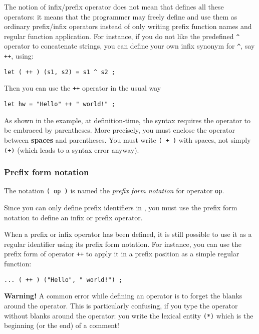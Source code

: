 The notion of infix/prefix operator does not mean that {\focal} defines all
these operators: it means that the programmer may freely define and use them
as ordinary prefix/infix operators instead of only writing prefix function
names and regular function application. For instance, if you do not like the
{\focal} predefined \verb"^" operator to concatenate strings, you can define your
own infix synonym for \verb"^", say {\tt ++}, using:

{\scriptsize
\begin{lstlisting}
let ( ++ ) (s1, s2) = s1 ^ s2 ;
\end{lstlisting}
}
Then you can use the {\tt ++} operator in the usual way
{\scriptsize
\begin{lstlisting}
let hw = "Hello" ++ " world!" ;
\end{lstlisting}
}

As shown in the example, at definition-time, the syntax requires
the operator to be embraced by parentheses. More precisely, you must
enclose the operator between {\bf spaces} and parentheses.
You must write {\tt ( + )} with spaces, not simply {\tt (+)} (which leads
to a syntax error anyway).

\subsubsection{Prefix form notation}

The notation {\tt ( op )} is named the {\em prefix form notation} for
operator {\tt op}.

Since you can only define prefix identifiers in {\focal}, you must use the
prefix form notation to define an infix or prefix operator.

When a prefix or infix operator has been defined, it is still possible
to use it as a regular identifier using its prefix form notation.
For instance, you can use the prefix form of operator {\tt ++}
to apply it in a prefix position as a simple regular function: %

{\scriptsize
\begin{lstlisting}
... ( ++ ) ("Hello", " world!") ;
\end{lstlisting}
}

{\bf Warning!} A common error while defining an operator is to forget
the blanks around the operator. This is particularly confusing, if you
type the {\tt *} operator without blanks around the operator: you
write the lexical entity {\tt (*)} which is the beginning (or the end)
of a comment!

